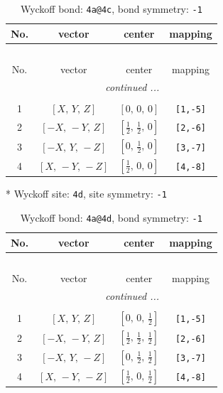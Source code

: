 \documentclass[fleqn,8pt]{jsarticle}
\begin{document}
\begin{longtable}{cccc}
\caption{Wyckoff bond: {\tt 4a@4c}, bond symmetry: {\tt -1}}
 \\
 \hline \hline
No. & vector & center & mapping \\ \hline \endfirsthead

\multicolumn{3}{l}{\tablename\ \thetable{}} \\
 \hline \hline
No. & vector & center & mapping \\ \hline \endhead

 \hline \hline
\multicolumn{3}{r}{\footnotesize\it continued ...} \\ \endfoot

 \hline \hline
\multicolumn{3}{r}{} \\ \endlastfoot

1 & $\left[ X,\, Y,\, Z \right]$ & $\left[ 0,\, 0,\, 0 \right]$ & {\tt [1,-5]} \\ \hline
2 & $\left[ - X,\, - Y,\, Z \right]$ & $\left[ \frac{1}{2},\, \frac{1}{2},\, 0 \right]$ & {\tt [2,-6]} \\ \hline
3 & $\left[ - X,\, Y,\, - Z \right]$ & $\left[ 0,\, \frac{1}{2},\, 0 \right]$ & {\tt [3,-7]} \\ \hline
4 & $\left[ X,\, - Y,\, - Z \right]$ & $\left[ \frac{1}{2},\, 0,\, 0 \right]$ & {\tt [4,-8]} \\
\end{longtable}
* Wyckoff site: {\tt 4d}, site symmetry: {\tt -1}
\renewcommand{\arraystretch}{1.2}
\begin{longtable}{cccc}
\caption{Wyckoff bond: {\tt 4a@4d}, bond symmetry: {\tt -1}}
 \\
 \hline \hline
No. & vector & center & mapping \\ \hline \endfirsthead

\multicolumn{3}{l}{\tablename\ \thetable{}} \\
 \hline \hline
No. & vector & center & mapping \\ \hline \endhead

 \hline \hline
\multicolumn{3}{r}{\footnotesize\it continued ...} \\ \endfoot

 \hline \hline
\multicolumn{3}{r}{} \\ \endlastfoot

1 & $\left[ X,\, Y,\, Z \right]$ & $\left[ 0,\, 0,\, \frac{1}{2} \right]$ & {\tt [1,-5]} \\ \hline
2 & $\left[ - X,\, - Y,\, Z \right]$ & $\left[ \frac{1}{2},\, \frac{1}{2},\, \frac{1}{2} \right]$ & {\tt [2,-6]} \\ \hline
3 & $\left[ - X,\, Y,\, - Z \right]$ & $\left[ 0,\, \frac{1}{2},\, \frac{1}{2} \right]$ & {\tt [3,-7]} \\ \hline
4 & $\left[ X,\, - Y,\, - Z \right]$ & $\left[ \frac{1}{2},\, 0,\, \frac{1}{2} \right]$ & {\tt [4,-8]} \\
\end{longtable}
\end{document}
